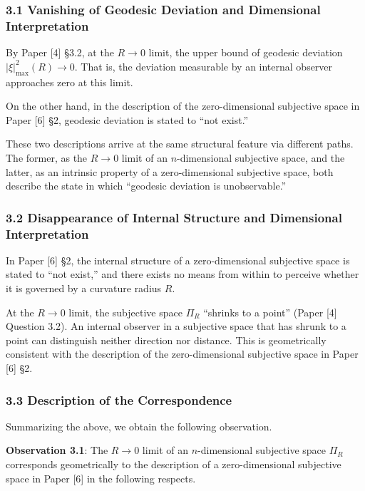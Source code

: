 \documentclass[a4paper,11pt]{article}
\theoremstyle{definition}
\begin{document}
\subsubsection{3.1 Vanishing of Geodesic Deviation and Dimensional
Interpretation}\label{vanishing-of-geodesic-deviation-and-dimensional-interpretation}

By Paper {[}4{]} §3.2, at the \(R \to 0\) limit, the upper bound of
geodesic deviation \(|\xi|^2_{\max}(R) \to 0\). That is, the deviation
measurable by an internal observer approaches zero at this limit.

On the other hand, in the description of the zero-dimensional subjective
space in Paper {[}6{]} §2, geodesic deviation is stated to ``not
exist.''

These two descriptions arrive at the same structural feature via
different paths. The former, as the \(R \to 0\) limit of an
\(n\)-dimensional subjective space, and the latter, as an intrinsic
property of a zero-dimensional subjective space, both describe the state
in which ``geodesic deviation is unobservable.''

\subsubsection{3.2 Disappearance of Internal Structure and Dimensional
Interpretation}\label{disappearance-of-internal-structure-and-dimensional-interpretation}

In Paper {[}6{]} §2, the internal structure of a zero-dimensional
subjective space is stated to ``not exist,'' and there exists no means
from within to perceive whether it is governed by a curvature radius
\(R\).

At the \(R \to 0\) limit, the subjective space \(\Pi_R\) ``shrinks to a
point'' (Paper {[}4{]} Question 3.2). An internal observer in a
subjective space that has shrunk to a point can distinguish neither
direction nor distance. This is geometrically consistent with the
description of the zero-dimensional subjective space in Paper {[}6{]}
§2.

\subsubsection{3.3 Description of the
Correspondence}\label{description-of-the-correspondence}

Summarizing the above, we obtain the following observation.

\textbf{Observation 3.1}: The \(R \to 0\) limit of an \(n\)-dimensional
subjective space \(\Pi_R\) corresponds geometrically to the description
of a zero-dimensional subjective space in Paper {[}6{]} in the following
respects.
\end{document}
